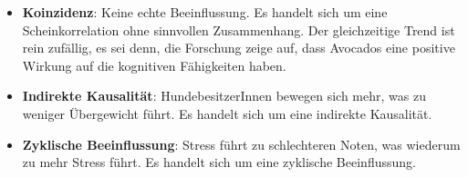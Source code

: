 \begin{myexercise}
\begin{myanswer}
\begin{itemize}
			\item \textbf{Koinzidenz}: Keine echte Beeinflussung. Es handelt sich um eine Scheinkorrelation ohne sinnvollen Zusammenhang. Der gleichzeitige Trend ist rein zufällig, es sei denn, die Forschung zeige auf, dass Avocados eine positive Wirkung auf die kognitiven Fähigkeiten haben.
			      \begin{center}
			      \end{center}

			\item \textbf{Indirekte Kausalität}: HundebesitzerInnen bewegen sich mehr, was zu weniger Übergewicht führt. Es handelt sich um eine indirekte Kausalität.
			      \begin{center}
			      \end{center}

			\item \textbf{Zyklische Beeinflussung}: Stress führt zu schlechteren Noten, was wiederum zu mehr Stress führt. Es handelt sich um eine zyklische Beeinflussung.
			      \begin{center}
			      \end{center}
		\end{itemize}
	\end{myanswer}
\end{myexercise}

